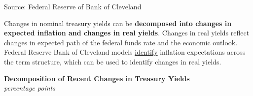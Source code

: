 \documentclass{report}
\newcommand{\tbllink}[1]{\href{https://raw.githubusercontent.com/bdecon/US-chartbook/master/chartbook/data/#1}{\faTable}}
\begin{document}
{\begin{minipage}{0.76\textwidth}
\footnotesize{Source: Federal Reserve of Bank of Cleveland}  \hfill \tbllink{real_rates2.csv}
\end{minipage}
\newpage
\begin{minipage}{0.76\textwidth} 
\small Changes in nominal treasury yields can be \textbf{decomposed into changes in expected inflation and changes in real yields}. Changes in real yields reflect changes in expected path of the federal funds rate and the economic outlook. Federal Reserve Bank of Cleveland models \href{https://www.clevelandfed.org/en/our-research/indicators-and-data/inflation-expectations.aspx}{identify} inflation expectations across the term structure, which can be used to identify changes in real yields. 


\vspace{2mm}

\normalsize \textbf{Decomposition of Recent Changes in Treasury Yields}\\
\footnotesize{\textit{percentage points}}
\vspace{4.2cm}


\end{minipage}}
\end{document}
